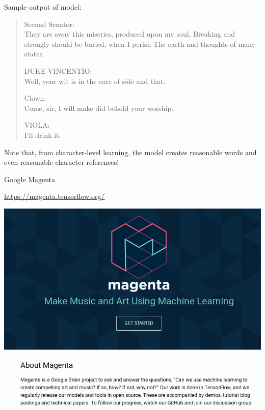 \documentclass[12pt,t]{beamer}
\begin{document}
\begin{frame}

Sample output of model:

\begin{quotation}
\noindent 
Second Senator: \\
\noindent
They are away this miseries, produced upon my soul,
Breaking and strongly should be buried, when I perish
The earth and thoughts of many states.
\bigskip

\noindent DUKE VINCENTIO: \\
\noindent Well, your wit is in the care of side and that.
\bigskip

\noindent Clown: \\
\noindent Come, sir, I will make did behold your worship.
\bigskip

\noindent VIOLA: \\
\noindent I'll drink it.
\end{quotation}

Note that, from character-level learning, the model creates reasonable words and even reasonable character references!

\end{frame}

\begin{frame}{Google Magenta}

\href{https://magenta.tensorflow.org/}{\color{blue}https://magenta.tensorflow.org/}
 \centerline{
\includegraphics[height=0.8\textheight]{./images/magenta.png} 
}


\end{frame}
\end{document}
